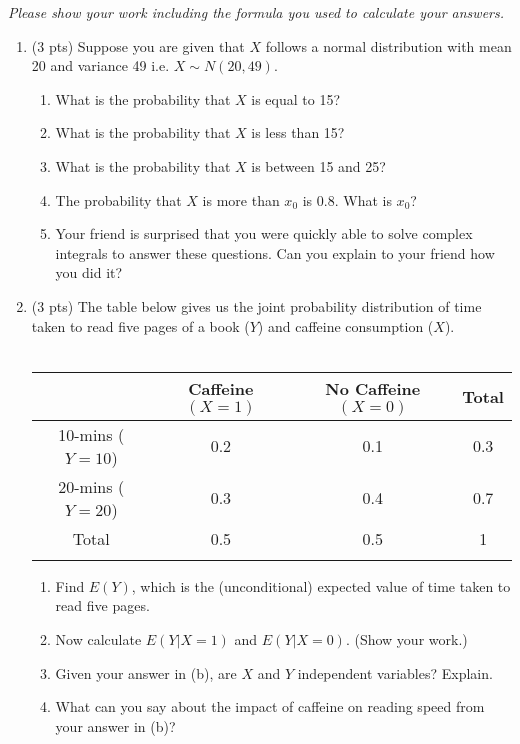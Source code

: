 \documentclass{./../../Latex/handout}
\begin{document}
\thispagestyle{plain}

\textit{Please show your work including the formula you used to calculate your answers.}

\begin{enumerate}

\item (3 pts) Suppose you are given that $X$ follows a normal distribution with mean 20 and variance 49 i.e. $X \sim N(20,49)$. 
 \begin{enumerate}
 \item What is the probability that $X$ is equal to 15?
\item What is the probability that $X$ is less than 15? 
\item What is the probability that $X$ is between 15 and 25?
\item The probability that $X$ is more than $x_0$ is 0.8. What is $x_0$?
\item Your friend is surprised that you were quickly able to solve complex integrals to answer these questions. Can you explain to your friend how you did it? \\
\end{enumerate} 

\item (3 pts) The table below gives us the joint probability distribution of time taken to read five pages of a book ($Y$)  and caffeine consumption ($X$). \\~\\
\begin{tabularx}{0.95\textwidth}{cccc}
\toprule
	& Caffeine $(X=1)$ & No Caffeine $(X=0)$ & Total \\
	\midrule
10-mins ($Y=10$) & 0.2  & 0.1 & 0.3 \\ 
20-mins ($Y=20$) & 0.3 & 0.4 & 0.7 \\
\midrule
 Total & 0.5 & 0.5 & 1 \\
 \bottomrule \\
\end{tabularx}
\begin{enumerate}
\item Find $E(Y)$, which is the (unconditional) expected value of time taken to read five pages.
\item Now calculate $E(Y|X=1)$ and $E(Y|X=0)$. (Show your work.)
\item Given your answer in (b), are $X$ and $Y$ independent variables? Explain.
\item What can you say about the impact of caffeine on reading speed from your answer in (b)? \\
\end{enumerate}


\end{enumerate}
\end{document}
